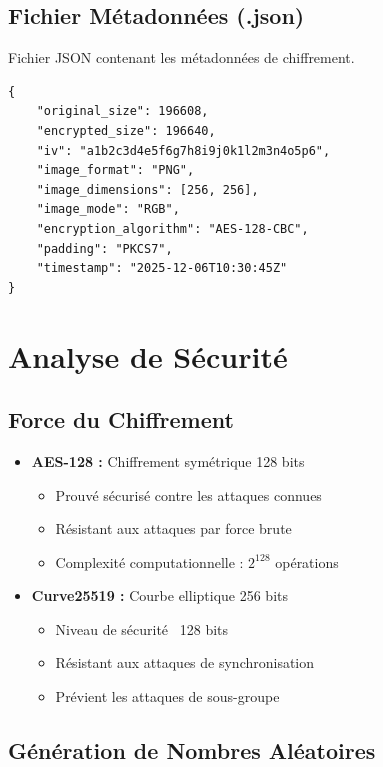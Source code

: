 \documentclass[12pt,a4paper]{report}
\begin{document}
\subsection{Fichier Métadonnées (.json)}

Fichier JSON contenant les métadonnées de chiffrement.

\begin{lstlisting}[caption=Exemple metadata.json]
{
    "original_size": 196608,
    "encrypted_size": 196640,
    "iv": "a1b2c3d4e5f6g7h8i9j0k1l2m3n4o5p6",
    "image_format": "PNG",
    "image_dimensions": [256, 256],
    "image_mode": "RGB",
    "encryption_algorithm": "AES-128-CBC",
    "padding": "PKCS7",
    "timestamp": "2025-12-06T10:30:45Z"
}
\end{lstlisting}

\section{Analyse de Sécurité}

\subsection{Force du Chiffrement}

\begin{itemize}
    \item \textbf{AES-128 :} Chiffrement symétrique 128 bits
    \begin{itemize}
        \item Prouvé sécurisé contre les attaques connues
        \item Résistant aux attaques par force brute
        \item Complexité computationnelle : $2^{128}$ opérations
    \end{itemize}
    
    \item \textbf{Curve25519 :} Courbe elliptique 256 bits
    \begin{itemize}
        \item Niveau de sécurité ~128 bits
        \item Résistant aux attaques de synchronisation
        \item Prévient les attaques de sous-groupe
    \end{itemize}
\end{itemize}

\subsection{Génération de Nombres Aléatoires}
\end{document}
